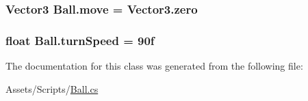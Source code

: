 \subsubsection[{move}]{\setlength{\rightskip}{0pt plus 5cm}Vector3 Ball.\+move = Vector3.\+zero\hspace{0.3cm}{\ttfamily [protected]}}\label{class_ball_a4fa4815ebae31c377b851144151c9f3d}
\hypertarget{class_ball_a7adb29497e06c56dc9dd0d55ded63aa2}{}
\subsubsection[{turn\+Speed}]{\setlength{\rightskip}{0pt plus 5cm}float Ball.\+turn\+Speed = 90f}\label{class_ball_a7adb29497e06c56dc9dd0d55ded63aa2}


The documentation for this class was generated from the following file\+:\begin{DoxyCompactItemize}
\item 
Assets/\+Scripts/\hyperlink{_ball_8cs}{Ball.\+cs}\end{DoxyCompactItemize}
